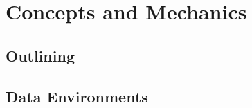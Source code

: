 \section{Concepts and Mechanics}
\label{sec:concepts}

\subsection{Outlining}
\label{sub:outlining}

\subsection{Data Environments}
\label{sub:data_environments}




